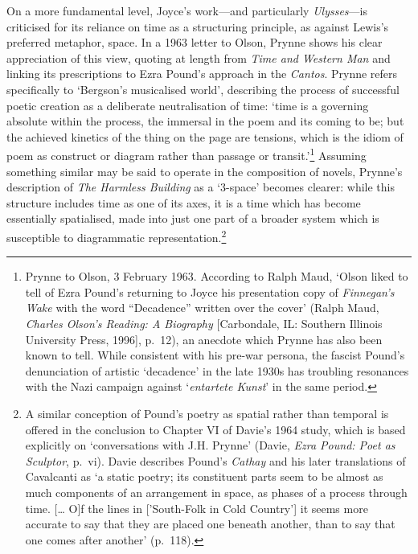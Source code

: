 \documentclass[]{article}
\begin{document}
On a more fundamental level, Joyce’s work—and particularly
\emph{Ulysses}—is criticised for its reliance on time as a structuring
principle, as against Lewis’s preferred metaphor, space. In a 1963
letter to Olson, Prynne shows his clear appreciation of this view,
quoting at length from \emph{Time and Western Man} and linking its
prescriptions to Ezra Pound’s approach in the \emph{Cantos}. Prynne
refers specifically to ‘Bergson’s musicalised world’, describing the
process of successful poetic creation as a deliberate neutralisation of
time: ‘time is a governing absolute within the process, the immersal in
the poem and its coming to be; but the achieved kinetics of the thing on
the page are tensions, which is the idiom of poem as construct or
diagram rather than passage or transit.’\footnote{Prynne to Olson, 3
  February 1963. According to Ralph Maud, ‘Olson liked to tell of Ezra
  Pound’s returning to Joyce his presentation copy of \emph{Finnegan’s
  Wake} with the word “Decadence” written over the cover’ (Ralph Maud,
  \emph{Charles Olson’s Reading: A Biography} {[}Carbondale, IL:
  Southern Illinois University Press, 1996{]}, p.~12), an anecdote which
  Prynne has also been known to tell. While consistent with his pre-war
  persona, the fascist Pound’s denunciation of artistic ‘decadence’ in
  the late 1930s has troubling resonances with the Nazi campaign against
  ‘\emph{entartete Kunst}’ in the same period.} Assuming something
similar may be said to operate in the composition of novels, Prynne’s
description of \emph{The Harmless Building} as a ‘3-space’ becomes
clearer: while this structure includes time as one of its axes, it is a
time which has become essentially spatialised, made into just one part
of a broader system which is susceptible to diagrammatic
representation.\footnote{A similar conception of Pound’s poetry as
  spatial rather than temporal is offered in the conclusion to Chapter
  VI of Davie’s 1964 study, which is based explicitly on ‘conversations
  with J.H. Prynne’ (Davie, \emph{Ezra Pound: Poet as Sculptor}, p.~vi).
  Davie describes Pound’s \emph{Cathay} and his later translations of
  Cavalcanti as ‘a static poetry; its constituent parts seem to be
  almost as much components of an arrangement in space, as phases of a
  process through time. {[}\ldots{} O{]}f the lines in {[}’South-Folk in
  Cold Country’{]} it seems more accurate to say that they are placed
  one beneath another, than to say that one comes after another’
  (p.~118).}
\end{document}
